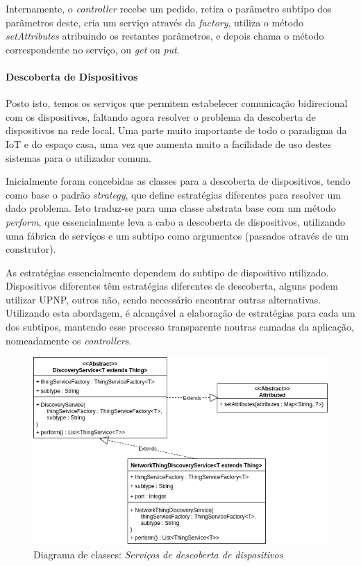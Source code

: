 Internamente, o \textit{controller} recebe um pedido, retira o parâmetro subtipo dos parâmetros deste, cria um serviço através da \textit{factory}, utiliza o método \textit{setAttributes} atribuindo os restantes parâmetros, e depois chama o método correspondente no serviço, ou \textit{get} ou \textit{put}.

\newpage

%
%
%
%

\paragraph*{Descoberta de Dispositivos}

Posto isto, temos os serviços que permitem estabelecer comunicação bidirecional com os dispositivos, faltando agora resolver o problema da descoberta de dispositivos na rede local. Uma parte muito importante de todo o paradigma da IoT e do espaço casa, uma vez que aumenta muito a facilidade de uso destes sistemas para o utilizador comum.

Inicialmente foram concebidas as classes para a descoberta de dispositivos, tendo como base o padrão \textit{strategy}, que define estratégias diferentes para resolver um dado problema. Isto traduz-se para uma classe abstrata base com um método \textit{perform}, que essencialmente leva a cabo a descoberta de dispositivos, utilizando uma fábrica de serviços e um subtipo como argumentos (passados através de um construtor).

As estratégias essencialmente dependem do subtipo de dispositivo utilizado. Dispositivos diferentes têm estratégias diferentes de descoberta, alguns podem utilizar UPNP, outros não, sendo necessário encontrar outras alternativas. Utilizando esta abordagem, é alcançável a elaboração de estratégias para cada um dos subtipos, mantendo esse processo transparente noutras camadas da aplicação, nomeadamente os \textit{controllers}.

\begin{figure}[H]
  \centering
        \includegraphics[scale=0.6]{img/hub-discovery.png}
  \caption{Diagrama de classes: \textit{Serviços de descoberta de dispositivos}}
\end{figure}


